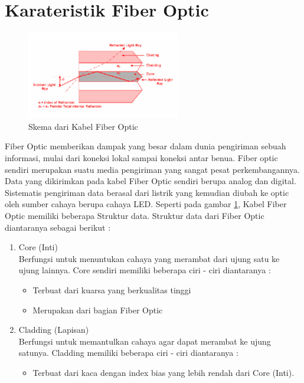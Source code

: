 \section{Karateristik Fiber Optic}
\begin{flushleft}
\begin{figure}[ht]
\centerline{\includegraphics[width=0.6\textwidth]{figures/skemafiber.png}}
\caption{Skema dari Kabel Fiber Optic}
\label{Skema Fiber Optic_03}
\end{figure}
Fiber Optic memberikan dampak yang besar dalam dunia pengiriman sebuah informasi, mulai dari koneksi lokal sampai koneksi antar benua. Fiber optic sendiri merupakan suatu media pengiriman yang sangat pesat perkembangannya. Data yang dikirimkan pada kabel Fiber Optic sendiri berupa analog dan digital. Sistematis pengiriman data berasal dari listrik yang kemudian diubah ke optic oleh sumber cahaya berupa cahaya LED. Seperti pada gambar \ref{Skema Fiber Optic_03}, Kabel Fiber Optic memiliki beberapa Struktur data. Struktur data dari Fiber Optic diantaranya sebagai berikut : 
\begin{enumerate}
\item Core (Inti)\\ Berfungsi untuk menuntukan cahaya yang merambat dari ujung satu ke ujung lainnya. Core sendiri memiliki beberapa ciri - ciri diantaranya : \\ 
	\begin{itemize}
	\item Terbuat dari kuarsa yang berkualitas tinggi
	\item Merupakan dari bagian Fiber Optic
	\end{itemize}
\item Cladding (Lapisan)\\ Berfungsi untuk memantulkan cahaya agar dapat merambat ke ujung satunya. Cladding memiliki beberapa ciri - ciri diantaranya : \\
	\begin{itemize}
	\item Terbuat dari kaca dengan index bias yang lebih rendah dari Core (Inti).

\end{itemize}
\end{enumerate}
\end{flushleft}
